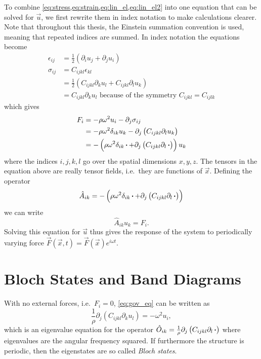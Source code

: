 To combine \cref{eq:stress,eq:strain,eq:lin_el,eq:lin_el2} into one equation
that can be solved for $\vec{u}$, we first
rewrite them in index notation to make calculations clearer.
Note that throughout this thesis, the Einstein summation convention is used,
meaning that repeated indices are summed. %
In index notation the equations become
\begin{align}
	\epsilon_{ij} &= \frac12(\partial_i u_j + \partial_j u_i)\\
	\label{eq:double_scalar_product_index_not}
	\sigma_{ij} &= C_{ijkl} \epsilon_{kl}\\
				&= \frac12\left(C_{ijkl} \partial_k u_l + C_{ijkl} \partial_l
				u_k\right)\\
				&= C_{ijkl} \partial_k u_l\text{ because of the symmetry $C_{ijkl}=C_{ijlk}$}
\end{align}
which gives
\begin{align}
	F_{i} &= -\rho \omega^2 u_{i} - \partial_j \sigma_{ij}\\
		   &= -\rho \omega^2 \delta_{ik} u_{k} -
		   \partial_j \left(C_{ijkl} \partial_l u_k\right)\\
		   &= -\left(\rho \omega^2 \delta_{ik} \operatorname{\boldsymbol{\cdot}} + 
		   \partial_j \left(C_{ijkl} \partial_l \operatorname{\boldsymbol{\cdot}}\right)\right) u_k
\end{align}
where the indices $i,j,k,l$ go over the spatial dimensions $x,y,z$.
The tensors in the equation above are really tensor fields, i.e.\ they are
functions of $\vec{x}$.
Defining the operator
\begin{equation}\label{eq:A_def}
	\hat A_{ik} =
	-\left(\rho \omega^2 \delta_{ik} \operatorname{\boldsymbol{\cdot}} +
	\partial_j \left(C_{ijkl} \partial_l \operatorname{\boldsymbol{\cdot}}\right)\right)
\end{equation}
we can write
\begin{equation}\label{eq:gov_eq}
	\hat A_{ik} u_k = F_i.
\end{equation}
Solving this equation for $\vec u$ thus gives the response of the system to
periodically varying force $\vec F(\vec x, t) = \vec F(\vec x) e^{i\omega t}$.

\section{Bloch States and Band Diagrams}\label{sec:bloch}

With no external forces, i.e.\ $F_i = 0$, \cref{eq:gov_eq} can be written as
\begin{equation}
	\frac 1 \rho \partial_j \left(C_{ijkl} \partial_k u_l\right) = -\omega^2 u_i,
\end{equation}
which is an eigenvalue equation for the operator
$\hat O_{ik} = \frac 1 \rho\partial_j \left(C_{ijkl} \partial_l \operatorname{\boldsymbol{\cdot}}\right)$
where eigenvalues are the angular frequency squared.
If furthermore the structure is periodic, then the eigenstates are so called
\emph{Bloch states}.

